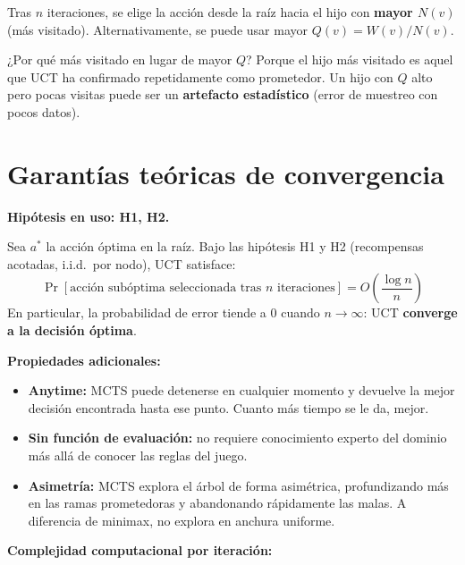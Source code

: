 \documentclass[12pt, a4paper]{article}
\begin{document}
Tras $n$ iteraciones, se elige la acción desde la raíz hacia el hijo con
\textbf{mayor $N(v)$} (más visitado). Alternativamente, se puede usar mayor
$Q(v) = W(v)/N(v)$.

\begin{tcolorbox}[clave]
¿Por qué más visitado en lugar de mayor $Q$? Porque el hijo más visitado es
aquel que UCT ha confirmado repetidamente como prometedor. Un hijo con $Q$
alto pero pocas visitas puede ser un \textbf{artefacto estadístico} (error de
muestreo con pocos datos).
\end{tcolorbox}

\section{Garantías teóricas de convergencia}

\textbf{Hipótesis en uso: H1, H2.}

\begin{tcolorbox}[teorema, title={Teorema de convergencia de UCT (Kocsis \& Szepesvári, 2006)}]
Sea $a^*$ la acción óptima en la raíz. Bajo las hipótesis H1 y H2 (recompensas
acotadas, i.i.d.\ por nodo), UCT satisface:
\[
  \Pr\!\left[\text{acción subóptima seleccionada tras } n
    \text{ iteraciones}\right] = O\!\left(\frac{\log n}{n}\right)
\]
En particular, la probabilidad de error tiende a $0$ cuando $n \to \infty$:
UCT \textbf{converge a la decisión óptima}.
\end{tcolorbox}

\textbf{Propiedades adicionales:}

\begin{itemize}
  \item \textbf{Anytime:} MCTS puede detenerse en cualquier momento y devuelve
    la mejor decisión encontrada hasta ese punto. Cuanto más tiempo se le da,
    mejor.
  \item \textbf{Sin función de evaluación:} no requiere conocimiento experto
    del dominio más allá de conocer las reglas del juego.
  \item \textbf{Asimetría:} MCTS explora el árbol de forma asimétrica,
    profundizando más en las ramas prometedoras y abandonando rápidamente las
    malas. A diferencia de minimax, no explora en anchura uniforme.
\end{itemize}

\textbf{Complejidad computacional por iteración:}
\end{document}
